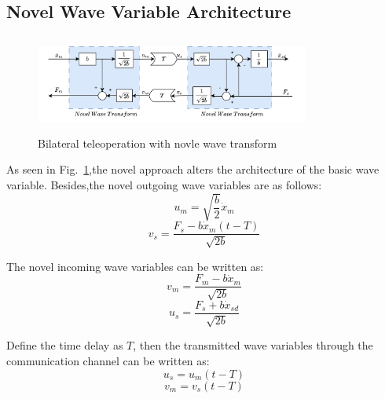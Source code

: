 \subsection{Novel Wave Variable Architecture}
\begin{figure}[htbp]
    \centerline{\includegraphics[height=3.2cm,width=9cm]{novel.jpg}}
    \caption{Bilateral teleoperation with novle wave transform}
    \label{fig3}
\end{figure}
As seen in Fig.~\ref{fig3},the novel approach alters the architecture of the basic wave variable.
Besides,the novel outgoing wave variables are as follows:
\begin{equation}
    u_m = \sqrt{\frac{b}{2}}\dot x_m\label{eq7}
\end{equation}
\begin{equation}
    v_s = \frac{F_s-b\dot x_m(t-T)}{\sqrt{2b}}\label{eq8}
\end{equation}


\par The novel incoming wave variables can be written as:
\begin{equation}
    {{v}_{m}}=\frac{{{F}_{m}}-b{{{\dot{x}}}_{m}}}{\sqrt{2b}}\label{eq9}
\end{equation}
\begin{equation}
    {{u}_{s}}=\frac{{{F}_{s}}+b{{{\dot{x}}}_{sd}}}{\sqrt{2b}}\label{eq10}
\end{equation}
\par Define the time delay as $T$, then the
transmitted wave variables through the communication channel can be written as:
\begin{equation}
    {u_s}={{u}_{m}}(t-T) \label{eqD}
\end{equation}
\begin{equation}
    {{v}_{m}}={{v}_{s}}(t-T) \label{eq11}
\end{equation}


